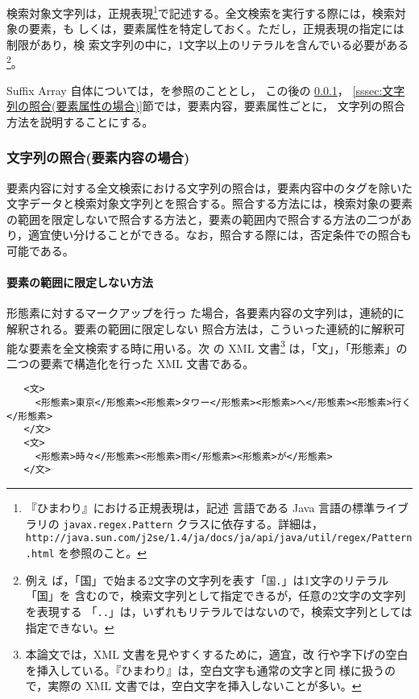 検索対象文字列は，正規表現\footnote{『ひまわり』における正規表現は，記述
言語である Java 言語の標準ライブラリの {\tt javax.regex.Pattern} クラスに依存する。詳細は， {\tt
http://java.sun.com/j2se/1.4/ja/docs/ja/api/java/util/regex/Pattern.html}
を参照のこと。}で記述する。全文検索を実行する際には，検索対象の要素，も
しくは，要素属性を特定しておく。ただし，正規表現の指定には制限があり，検
索文字列の中に，1文字以上のリテラルを含んでいる必要がある\footnote{例え
ば，「国」で始まる2文字の文字列を表す「{\tt 国.}」は1文字のリテラル「国」を
含むので，検索文字列として指定できるが，任意の2文字の文字列を表現する
「{\tt ..}」は，いずれもリテラルではないので，検索文字列としては指定できない。}。

Suffix Array 自体については，を参照のこととし，
この後の
\ref{sssec:文字列の照合(要素内容の場合)}，
\ref{sssec:文字列の照合(要素属性の場合)}節では，要素内容，要素属性ごとに，
文字列の照合方法を説明することにする。


\subsubsection{文字列の照合(要素内容の場合)}
\label{sssec:文字列の照合(要素内容の場合)}
要素内容に対する全文検索における文字列の照合は，要素内容中のタグを除いた
文字データと検索対象文字列とを照合する。照合する方法には，検索対象の要素
の範囲を限定しないで照合する方法と，要素の範囲内で照合する方法の二つがあ
り，適宜使い分けることができる。なお，照合する際には，否定条件での照合も
可能である。

\paragraph{要素の範囲に限定しない方法} 形態素に対するマークアップを行っ
た場合，各要素内容の文字列は，連続的に解釈される。要素の範囲に限定しない
照合方法は，こういった連続的に解釈可能な要素を全文検索する時に用いる。次
の XML 文書\footnote{本論文では，XML 文書を見やすくするために，適宜，改
行や字下げの空白を挿入している。『ひまわり』は，空白文字も通常の文字と同
様に扱うので，実際の XML 文書では，空白文字を挿入しないことが多い。}
は，「文」，「形態素」の二つの要素で構造化を行った XML 文書である。

{\small \begin{verbatim}
   <文>
     <形態素>東京</形態素><形態素>タワー</形態素><形態素>へ</形態素><形態素>行く</形態素>
   </文>
   <文>
     <形態素>時々</形態素><形態素>雨</形態素><形態素>が</形態素>
   </文>
\end{verbatim}}

